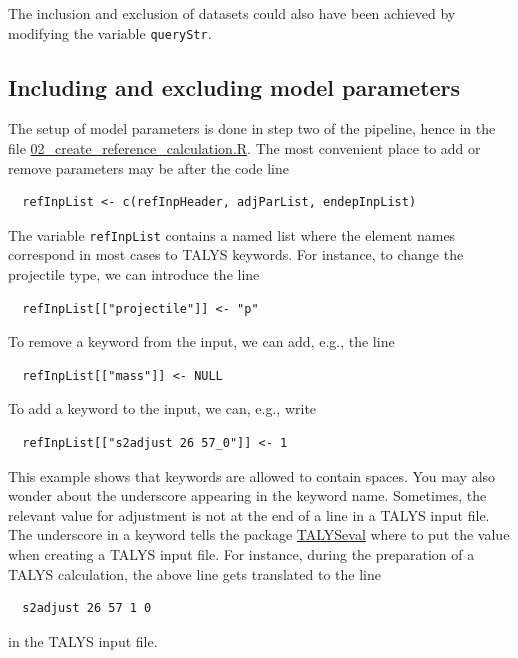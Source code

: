 \documentclass[12pt,a4paper]{scrartcl}
\begin{document}
The inclusion and exclusion of datasets could also have been achieved by modifying the variable \verb#queryStr#.
   
 \subsection{Including and excluding model parameters}
 The setup of model parameters is done in step two of the pipeline, hence in the file
 \href{https://github.com/gschnabel/eval-fe56/blob/master/script/02_create_reference_calculation.R}{02\_create\_reference\_calculation.R}. 
 The most convenient place to add or remove parameters may be after the code line
\begin{verbatim}
  refInpList <- c(refInpHeader, adjParList, endepInpList)
\end{verbatim}
The variable \verb#refInpList# contains a named list where the element names correspond in most cases to TALYS keywords.
For instance, to change the projectile type, we can introduce the line
\begin{verbatim}
  refInpList[["projectile"]] <- "p"
\end{verbatim}
To remove a keyword from the input, we can add, e.g., the line
\begin{verbatim}
  refInpList[["mass"]] <- NULL
\end{verbatim}
To add a keyword to the input, we can, e.g., write
\begin{verbatim}
  refInpList[["s2adjust 26 57_0"]] <- 1
\end{verbatim}
This example shows that keywords are allowed to contain spaces.
You may also wonder about the underscore appearing in the keyword name.
Sometimes, the relevant value for adjustment is not at the end of a line in a TALYS input file.
The underscore in a keyword tells the package \href{https://github.com/gschnabel/TALYSeval/}{TALYSeval} where to put the value when creating a TALYS input file.
For instance, during the preparation of a TALYS calculation, the above line gets translated to the line
\begin{verbatim}
  s2adjust 26 57 1 0
\end{verbatim}
in the TALYS input file.
\end{document}

